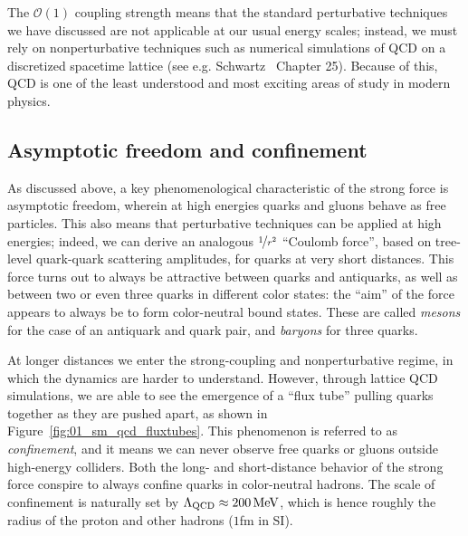The $\mathcal O(1)$ coupling strength means that the standard perturbative techniques we have discussed are not applicable at our usual energy scales; instead, we must rely on nonperturbative techniques such as numerical simulations of QCD on a discretized spacetime lattice (see e.g. Schwartz~\cite{Schwartz:2014sze} Chapter 25).
Because of this, QCD is one of the least understood and most exciting areas of study in modern physics.



\subsection{Asymptotic freedom and confinement}
\label{sec:01_sm_qcd_asymptotic}

As discussed above, a key phenomenological characteristic of the strong force is asymptotic freedom, wherein at high energies quarks and gluons behave as free particles.
This also means that perturbative techniques can be applied at high energies; indeed, we can derive an analogous $\cnicefrac{1}{r^2}$ ``Coulomb force'', based on tree-level quark-quark scattering amplitudes, for quarks at very short distances.
This force turns out to always be attractive between quarks and antiquarks, as well as between two or even three quarks in different color states: the ``aim'' of the force appears to always be to form color-neutral bound states.
These are called \textit{mesons} for the case of an antiquark and quark pair, and \textit{baryons} for three quarks.

At longer distances we enter the strong-coupling and nonperturbative regime, in which the dynamics are harder to understand.
However, through lattice QCD simulations, we are able to see the emergence of a ``flux tube'' pulling quarks together as they are pushed apart, as shown in Figure~\ref{fig:01_sm_qcd_fluxtubes}.
This phenomenon is referred to as \textit{confinement}, and it means we can never observe free quarks or gluons outside high-energy colliders.
Both the long- and short-distance behavior of the strong force conspire to always confine quarks in color-neutral hadrons.
The scale of confinement is naturally set by $\Lambda_{\mathrm{QCD}} \approx 200 \,\text{Me\hspace{-.08em}V}$, which is hence roughly the radius of the proton and other hadrons ($1$fm in SI).

